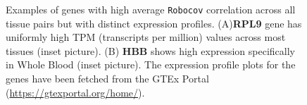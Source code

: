 \documentclass{bioinfo}
\def\Robocov{\texttt{Robocov}}
\begin{document}
\begin{figure}[!tpb]
\centering
{}
\caption{\small {{Examples of genes with high average \Robocov{} correlation across all tissue pairs but with distinct expression profiles. (A)\textbf{RPL9} gene has uniformly high TPM (transcripts per million) values across most tissues (inset picture). (B) \textbf{HBB} shows high expression specifically in Whole Blood (inset picture). The expression profile plots for the genes have been fetched from the GTEx Portal (\url{https://gtexportal.org/home/}).}}}
\label{fig:gtex_examples_main}
\end{figure}
\end{document}
